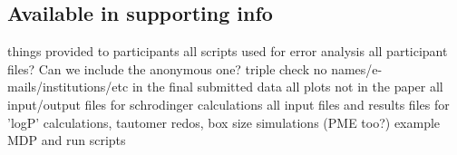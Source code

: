 \subsection{Available in supporting info} %
things provided to participants
all scripts used for error analysis
all participant files? Can we include the anonymous one? %
triple check no names/e-mails/institutions/etc in the final submitted data
all plots not in the paper
all input/output files for schrodinger calculations
all input files and results files for 'logP' calculations, tautomer redos, box size simulations (PME too?)  %
example MDP and run scripts
 




